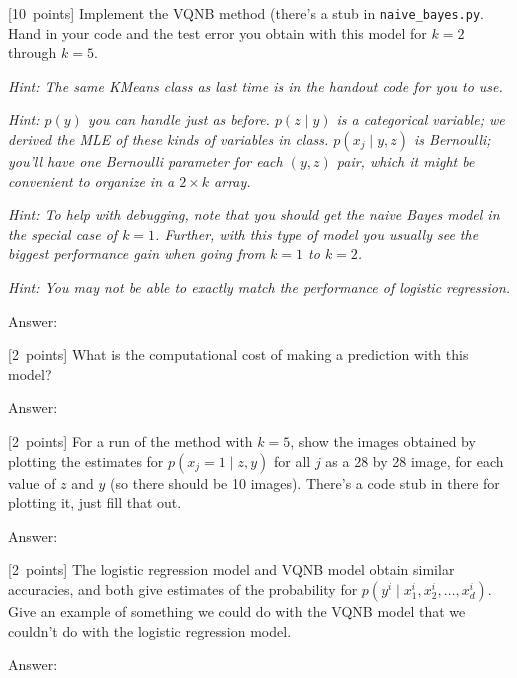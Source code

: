 \documentclass{article}
\newcommand{\ask}[1]{\textcolor{question}{#1}}
\newenvironment{answer}{\par\begingroup\color{answer}Answer: }{\endgroup}
\newcommand{\pts}[1]{\textcolor{points}{[#1~points]}}
\newcommand{\hint}[1]{\textcolor{black!60!white}{\emph{Hint: #1}}}
\newcommand{\TODO}{\color{red}{TODO}}
\begin{document}
\begin{qlist}[resume]
\item \pts{10}
    Implement the VQNB method (there's a stub in \texttt{naive\_bayes.py}.
    \ask{Hand in your code and the test error you obtain with this model for $k=2$ through $k=5$.}

    \hint{The same KMeans class as last time is in the handout code for you to use.}

    \hint{
        $p(y)$ you can handle just as before.
        $p(z \mid y)$ is a categorical variable; we derived the MLE of these kinds of variables in class.
        $p(x_j \mid y, z)$ is Bernoulli; you'll have one Bernoulli parameter for each $(y, z)$ pair, which it might be convenient to organize in a $2 \times k$ array.
    }

    \hint{To help with debugging, note that you should get the naive Bayes model in the special case of $k=1$. Further, with this type of model you usually see the biggest performance gain when going from $k=1$ to $k=2$.}

    \hint{You may not be able to exactly match the performance of logistic regression.}

\begin{answer}\TODO\end{answer}


\item \pts{2} \ask{What is the computational cost of making a prediction with this model?}

\begin{answer}\TODO\end{answer}

\item \pts{2}
    For a run of the method with $k=5$,
    \ask{show the images obtained by plotting the estimates for $p(x_j = 1 \mid z, y)$ for all $j$ as a 28 by 28 image, for each value of $z$ and $y$} (so there should be 10 images).
    There's a code stub in there for plotting it, just fill that out.

\begin{answer}\TODO\end{answer}


\item \pts{2}
    The logistic regression model and VQNB model obtain similar accuracies,
    and both give estimates of the probability for $p(y^i \mid x_1^i, x_2^i, \dots, x_d^i)$. 
    \ask{Give an example of something we could do with the VQNB model that we couldn't do with the logistic regression model.}

\begin{answer}\TODO\end{answer}

\end{qlist}
\end{document}
